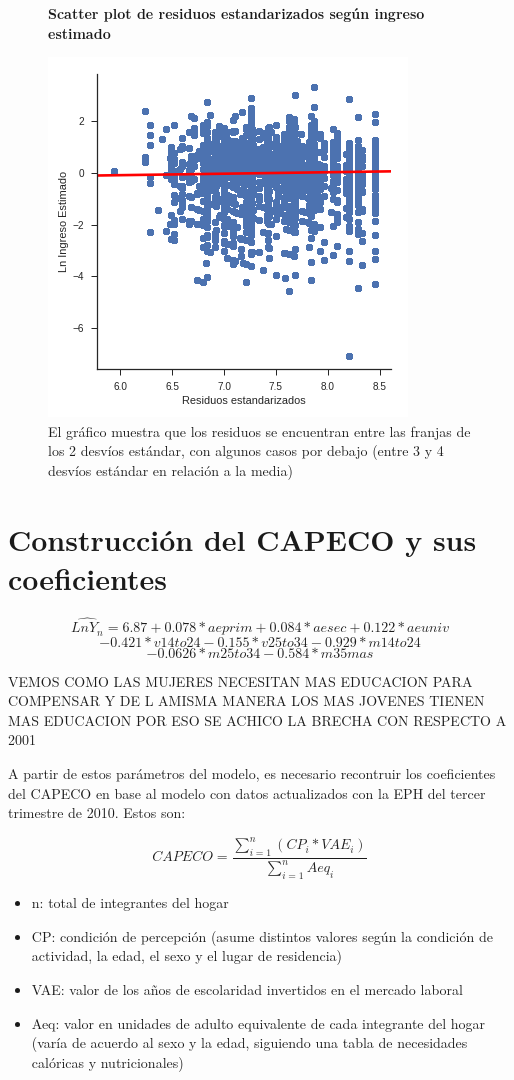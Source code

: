     \begin{figure}[!htb]
    	\centering
    	\textbf{Scatter plot de residuos estandarizados según ingreso estimado}\par\medskip
    	\includegraphics[scale = 0.4]{../img/capitulo3/residuosVestimado.png}
    	\caption{El gráfico muestra que los residuos se encuentran entre las franjas de los 2 desvíos estándar, con algunos casos por debajo (entre 3 y 4 desvíos estándar en relación a la media)}
    	\label{fig:residuosVestimado.png}
    \end{figure}

\section{Construcción del CAPECO y sus coeficientes}

$$\hat{Ln Y_n} = 6.87 + 0.078 * aeprim + 0.084 * aesec + 0.122 * aeuniv $$
$$ - 0.421 * v14to24 - 0.155 * v25to34 - 0.929 * m14to24  $$
$$-0.0626 * m25to34 - 0.584 * m35mas $$

VEMOS COMO LAS MUJERES NECESITAN MAS EDUCACION PARA COMPENSAR Y DE L AMISMA MANERA LOS MAS JOVENES TIENEN MAS EDUCACION POR ESO SE ACHICO LA BRECHA CON RESPECTO A 2001

A partir de estos parámetros del modelo, es necesario recontruir los coeficientes del CAPECO en base al modelo con datos actualizados con la EPH del tercer trimestre de 2010. Estos son:

$$ CAPECO = \frac{\displaystyle\sum_{i=1}^{n}(CP_i * VAE_i)}{\displaystyle\sum_{i=1}^{n}Aeq_i} $$

\begin{itemize}
	\item n: total de integrantes del hogar
	\item CP: condición de percepción (asume distintos valores según la condición de actividad, la edad, el sexo y el lugar de residencia)
	\item VAE: valor de los años de escolaridad invertidos en el mercado laboral
	\item Aeq: valor en unidades de adulto equivalente de cada integrante del hogar (varía de acuerdo al sexo y la edad, siguiendo una tabla de necesidades calóricas y nutricionales)
\end{itemize}

